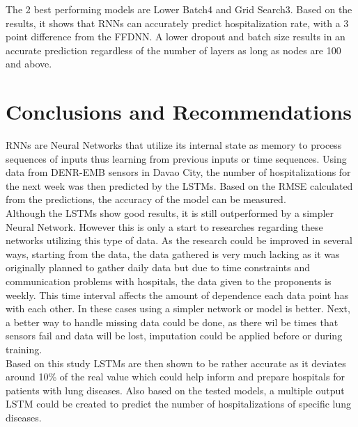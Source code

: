 \documentclass[10pt,11pt,12pt,oneside]{book}
\begin{document}
    The 2 best performing models are Lower Batch4 and Grid Search3. Based on the results, it shows that RNNs can accurately predict hospitalization rate, with a 3 point difference from the FFDNN. A lower dropout and batch size results in an accurate prediction regardless of the number of layers as long as nodes are 100 and above.   
\chapter{Conclusions and Recommendations}
RNNs are Neural Networks that utilize its internal state as memory to process sequences of inputs thus learning from previous inputs or time sequences. Using data from DENR-EMB sensors in Davao City, the number of hospitalizations for the next week was then predicted by the LSTMs. Based on the RMSE calculated from the predictions, the accuracy of the model can be measured.\\

Although the LSTMs show good results, it is still outperformed by a simpler Neural Network. However this is only a start to researches regarding these networks utilizing this type of data. As the research could be improved in several ways, starting from the data, the data gathered is very much lacking as it was originally planned to gather daily data but due to time constraints and communication problems with hospitals, the data given to the proponents is weekly. This
time interval affects the amount of dependence each data point has with each other. In these cases using a simpler network or model is better. Next, a better way to handle missing data could be done, as there wil be times that sensors fail and data will be lost, imputation could be applied before or during training. \\

Based on this study LSTMs are then shown to be rather accurate as it deviates around 10\% of the real value which could help inform and prepare hospitals for patients with lung diseases. Also based on the tested models, a multiple output LSTM could be created to predict the number of hospitalizations of specific lung diseases.  
    
    
    
\end{document}
